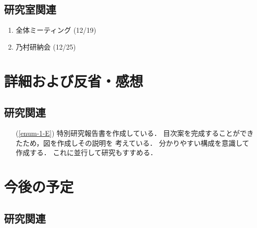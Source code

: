 \documentclass[fleqn, 14pt]{extarticle}
\begin{document}
\subsection{研究室関連}
\label{sec-2-2}
\begin{enumerate}
\item 全体ミーティング 
\hfill
\label{enum-lab1}
(12/19)
\item 乃村研納会
\hfill
\label{enum-lab3}
(12/25)
\end{enumerate}


\section{詳細および反省・感想}
\label{sec-3}
\subsection{研究関連}
\label{sec-3-1}

\begin{itemize}
\item[(\ref{enum-1-E})]
    特別研究報告書を作成している．
    目次案を完成することができたため，図を作成しその説明を
    考えている．
    分かりやすい構成を意識して作成する．
    これに並行して研究もすすめる．
\end{itemize}


\section{今後の予定}
\label{sec-4}
\subsection{研究関連}
\label{sec-4-1}
\end{document}
